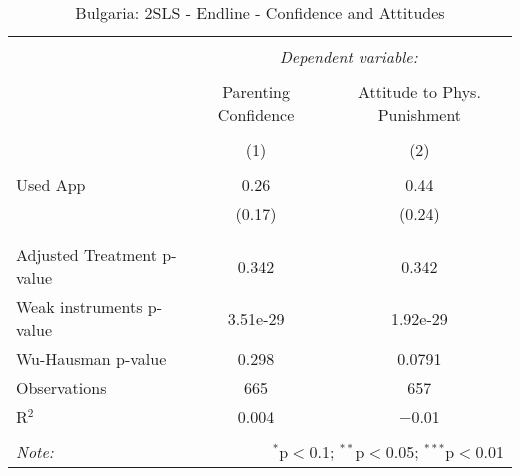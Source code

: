 
\begin{table}[!htbp] \centering 
  \caption{Bulgaria: 2SLS - Endline - Confidence and Attitudes} 
  \label{tbl:Bulgaria: 2SLS - Endline - Confidence and Attitudes} 
\begin{tabular}{@{\extracolsep{5pt}}lcc} 
\\[-1.8ex]\hline 
\hline \\[-1.8ex] 
 & \multicolumn{2}{c}{\textit{Dependent variable:}} \\ 
\cline{2-3} 
\\[-1.8ex] & Parenting Confidence & Attitude to Phys. Punishment \\ 
\\[-1.8ex] & (1) & (2)\\ 
\hline \\[-1.8ex] 
 Used App & 0.26 & 0.44 \\ 
  & (0.17) & (0.24) \\ 
  & & \\ 
\hline \\[-1.8ex] 
Adjusted Treatment p-value & 0.342 & 0.342 \\ 
Weak instruments p-value & 3.51e-29 & 1.92e-29 \\ 
Wu-Hausman p-value & 0.298 & 0.0791 \\ 
Observations & 665 & 657 \\ 
R$^{2}$ & 0.004 & $-$0.01 \\ 
\hline 
\hline \\[-1.8ex] 
\textit{Note:}  & \multicolumn{2}{r}{$^{*}$p$<$0.1; $^{**}$p$<$0.05; $^{***}$p$<$0.01} \\ 
\end{tabular} 
\end{table} 

